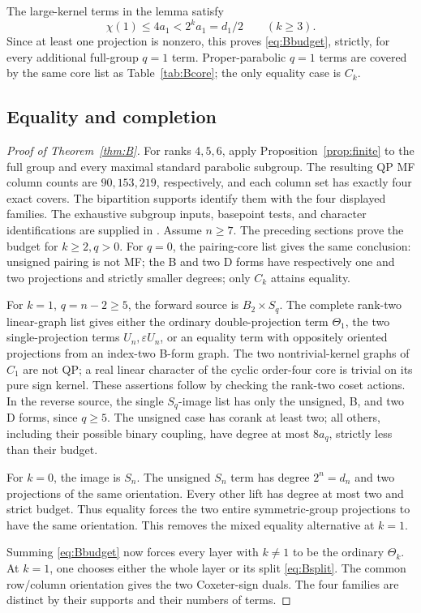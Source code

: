 \documentclass[11pt]{article}
\numberwithin{equation}{section}
\theoremstyle{definition}
\newcommand{\ee}{\varepsilon}
\begin{document}
The large-kernel terms in the lemma satisfy
\[
 \chi(1)\leq4a_1<2^ka_1=d_1/2\qquad(k\geq3).
\]
Since at least one projection is nonzero, this proves \eqref{eq:Bbudget}, strictly, for every additional full-group \(q=1\) term.
Proper-parabolic \(q=1\) terms are covered by the same core list as Table~\ref{tab:Bcore}; the only equality case is \(C_k\).

\subsection{Equality and completion}

\begin{proof}[Proof of Theorem~\ref{thm:B}]
For ranks \(4,5,6\), apply Proposition~\ref{prop:finite} to the full group and every maximal standard parabolic subgroup.
The resulting QP MF column counts are \(90,153,219\), respectively, and each column set has exactly four exact covers.
The bipartition supports identify them with the four displayed families.
The exhaustive subgroup inputs, basepoint tests, and character identifications are supplied in \cite{ZhangData}.
Assume \(n\geq7\).
The preceding sections prove the budget for \(k\geq2,q>0\).
For \(q=0\), the pairing-core list gives the same conclusion:
unsigned pairing is not MF; the B and two D forms have respectively one and two projections and strictly smaller degrees; only \(C_k\) attains equality.

For \(k=1\), \(q=n-2\geq5\), the forward source is \(B_2\times S_q\).
The complete rank-two linear-graph list gives either the ordinary double-projection term \(\Theta_1\), the two single-projection terms \(U_n,\ee U_n\), or an equality term with oppositely oriented projections from an index-two B-form graph.
The two nontrivial-kernel graphs of \(C_1\) are not QP; a real linear character of the cyclic order-four core is trivial on its pure sign kernel.
These assertions follow by checking the rank-two coset actions.
In the reverse source, the single \(S_q\)-image list has only the unsigned, B, and two D forms, since \(q\geq5\).
The unsigned case has corank at least two; all others, including their possible binary coupling, have degree at most \(8a_q\), strictly less than their budget.

For \(k=0\), the image is \(S_n\).
The unsigned \(S_n\) term has degree \(2^n=d_n\) and two projections of the same orientation.
Every other lift has degree at most two and strict budget.
Thus equality forces the two entire symmetric-group projections to have the same orientation.
This removes the mixed equality alternative at \(k=1\).

Summing \eqref{eq:Bbudget} now forces every layer with \(k\ne1\) to be the ordinary \(\Theta_k\).
At \(k=1\), one chooses either the whole layer or its split \eqref{eq:Bsplit}.
The common row/column orientation gives the two Coxeter-sign duals.
The four families are distinct by their supports and their numbers of terms.
\end{proof}
\end{document}
